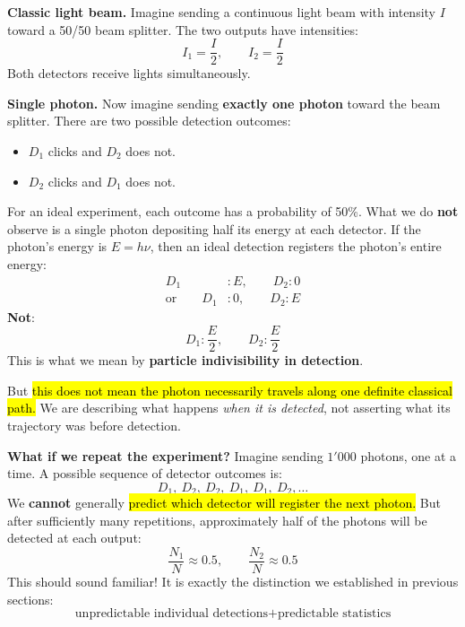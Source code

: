 \begin{deepeningbox}
    \textbf{Classic light beam.} Imagine sending a continuous light beam with intensity $I$ toward a 50/50 beam splitter. The two outputs have intensities:
    \begin{equation*}
        I_1 = \frac{I}{2},\qquad I_2 = \frac{I}{2}
    \end{equation*}
    Both detectors receive lights simultaneously.

    \highspace
    \textbf{Single photon.} Now imagine sending \textbf{exactly one photon} toward the beam splitter. There are two possible detection outcomes:
    \begin{itemize}
        \item $D_1$ clicks and $D_2$ does not.
        \item $D_2$ clicks and $D_1$ does not.
    \end{itemize}
    For an ideal experiment, each outcome has a probability of 50\%. What we do \textbf{not} observe is a single photon depositing half its energy at each detector. If the photon's energy is $E=h\nu$, then an ideal detection registers the photon's entire energy:
    \begin{equation*}
        \begin{aligned}
            D_1 &: E,\qquad D_2:0\\
            \text{or}\qquad D_1 &:0,\qquad D_2:E
        \end{aligned}
    \end{equation*}
    \textbf{Not}:
    \begin{equation*}
        D_1:\frac{E}{2},
        \qquad
        D_2:\frac{E}{2}
    \end{equation*}
    This is what we mean by \textbf{particle indivisibility in detection}.

    \highspace
    But \hl{this does not mean the photon necessarily travels along one definite classical path.} We are describing what happens \emph{when it is detected}, not asserting what its trajectory was before detection.
\end{deepeningbox}

\highspace
\textcolor{Green3}{ \textbf{What if we repeat the experiment?}} Imagine sending $1'000$ photons, one at a time. A possible sequence of detector outcomes is:
\begin{equation*}
    D_1,\ D_2,\ D_2,\ D_1,\ D_1,\ D_2,\ldots
\end{equation*}
We \textbf{cannot} generally \hl{predict which detector will register the next photon.} But after sufficiently many repetitions, approximately half of the photons will be detected at each output:
\begin{equation*}
    \frac{N_1}{N}\approx 0.5,
    \qquad
    \frac{N_2}{N}\approx 0.5
\end{equation*}
This should sound familiar! It is exactly the distinction we established in previous sections:
\begin{equation*}
    \text{unpredictable individual detections}
    +
    \text{predictable statistics}
\end{equation*}

